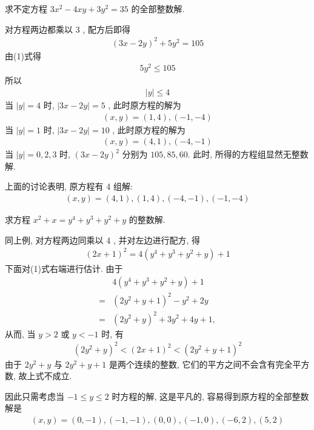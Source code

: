\begin{example}
	求不定方程 $3 x^{2}-4 x y+3 y^{2}=35$ 的全部整数解.
\end{example}
\begin{solution}
	对方程两边都乘以 3 , 配方后即得
	\begin{align*}
		(3 x-2 y)^{2}+5 y^{2}=105
	\end{align*}
	由(1)式得
	\begin{align*}
		5 y^{2} \leqslant 105
	\end{align*}
	所以
	\begin{align*}
		|y| \leqslant 4
	\end{align*}
	当 $|y|=4$ 时, $|3 x-2 y|=5$ , 此时原方程的解为
	\begin{align*}
		(x, y)=(1,4),(-1,-4)
	\end{align*}
	当 $|y|=1$ 时, $|3 x-2 y|=10$ , 此时原方程的解为
	\begin{align*}
		(x, y)=(4,1),(-4,-1)
	\end{align*}
	当 $|y|=0,2,3$ 时, $(3 x-2 y)^{2}$ 分别为 $105,85,60$. 此时, 所得的方程组显然无整数解.

	上面的讨论表明, 原方程有 4 组解:
	\begin{align*}
		(x, y)=(4,1),(1,4),(-4,-1),(-1,-4)
	\end{align*}
\end{solution}

\begin{example}
	求方程 $x^{2}+x=y^{4}+y^{3}+y^{2}+y$ 的整数解.
\end{example}
\begin{solution}
	同上例, 对方程两边同乘以 4 , 并对左边进行配方, 得
	\begin{align*}
		(2 x+1)^{2}=4\left(y^{4}+y^{3}+y^{2}+y\right)+1
	\end{align*}
	下面对(1)式右端进行估计. 由于
	\begin{align}
		  & 4\left(y^{4}+y^{3}+y^{2}+y\right)+1       \\
		= & \left(2 y^{2}+y+1\right)^{2}-y^{2}+2 y    \\
		= & \left(2 y^{2}+y\right)^{2}+3 y^{2}+4 y+1,
	\end{align}
	从而, 当 $y>2$ 或 $y<-1$ 时, 有
	\begin{align*}
		\left(2 y^{2}+y\right)^{2}<(2 x+1)^{2}<\left(2 y^{2}+y+1\right)^{2}
	\end{align*}
	由于 $2 y^{2}+y$ 与 $2 y^{2}+y+1$ 是两个连续的整数, 它们的平方之间不会含有完全平方数, 故上式不成立.

	因此只需考虑当 $-1 \leqslant y \leqslant 2$ 时方程的解, 这是平凡的, 容易得到原方程的全部整数解是
	\begin{align*}
		(x, y)=(0,-1),(-1,-1),(0,0),(-1,0),(-6,2),(5,2)
	\end{align*}
\end{solution}

